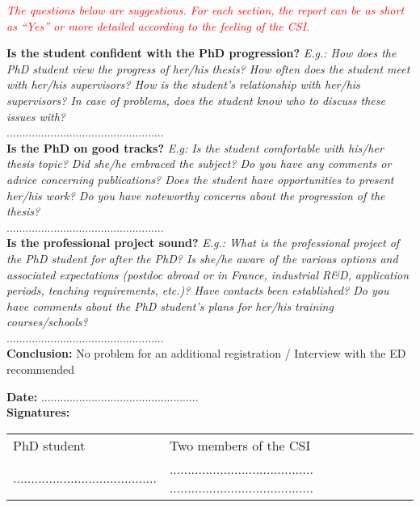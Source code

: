 \documentclass[12pt]{article}
\newcommand{\commentaire}[1]{\small\textit{#1}}
\begin{document}
\commentaire{%
  \textcolor{red}{The questions below are suggestions. For each
    section, the report can be as short as “Yes” or more detailed
    according to the feeling of the CSI.\\}}

\noindent\textbf{Is the student confident with the PhD progression?}
\commentaire{%
  E.g.: How does the PhD student view the progress of
  her/his thesis? How often does the student meet with her/his
  supervisors? How is the student’s relationship with her/his
  supervisors? In case of problems, does the student know who to
  discuss these issues with?\\}
..................................................
\\

\noindent\textbf{Is the PhD on good tracks?}
\commentaire{%
  E.g: Is the student comfortable with his/her thesis topic? Did
  she/he embraced the subject? Do you have any comments or advice
  concerning publications? Does the student have opportunities to
  present her/his work? Do you have noteworthy concerns about the
  progression of the thesis?\\}
..................................................
\\

\noindent\textbf{Is the professional project sound?}
\commentaire{%
  E.g.: What is the professional project of the PhD student for after
  the PhD? Is she/he aware of the various options and associated
  expectations (postdoc abroad or in France, industrial R\&D,
  application periods, teaching requirements, etc.)? Have contacts
  been established? Do you have comments about the PhD student’s
  plans for her/his training courses/schools?\\}
..................................................
\\

\noindent\textbf{Conclusion:}
No problem for an additional registration / Interview with the ED
recommended

\bigskip

\noindent\textbf{Date:}
..................................................
\\

\noindent\textbf{Signatures:}

\begin{tabular}{p{5cm}p{12cm}}
  PhD student & Two members of the CSI\\
  ........................................
  &
  ........................................
  ........................................
\end{tabular}
\end{document}
